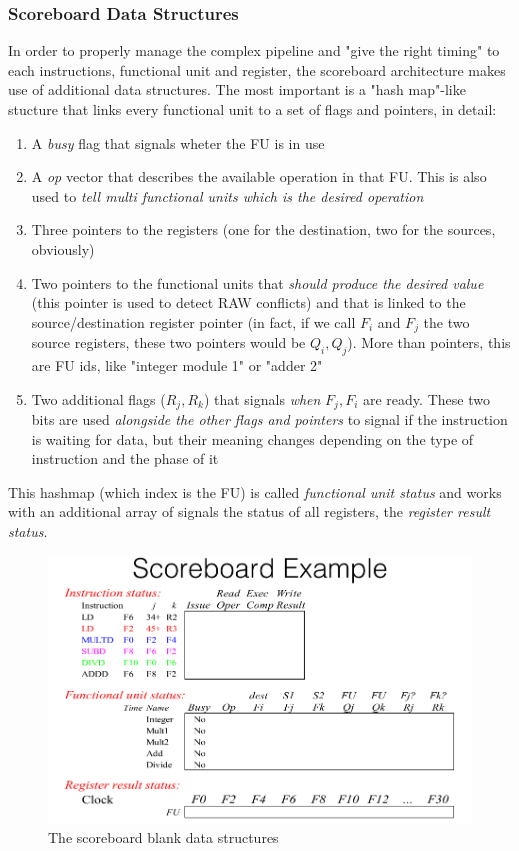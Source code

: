 \documentclass[10pt,a4paper]{article}
\begin{document}
				\subsubsection{Scoreboard Data Structures}
 					In order to properly manage the complex pipeline and "give the right timing" to each instructions, functional unit and register, the scoreboard architecture makes use of additional data structures. The most important is a "hash map"-like stucture that links every functional unit to a set of flags and pointers, in detail:
 					\begin{enumerate}
 						\item A \emph{busy} flag that signals wheter the FU is in use
 						\item A \emph{op} vector that describes the available operation in that FU. This is also used to \emph{tell multi functional units which is the desired operation}
 						\item Three pointers to the registers (one for the destination, two for the sources, obviously)
 						\item Two pointers to the functional units that \emph{should produce the desired value} (this pointer is used to detect RAW conflicts) and that is linked to the source/destination register pointer (in fact, if we call $F_i$ and $F_j$ the two source registers, these two pointers would be $Q_i, Q_j$). More than pointers, this are FU ids, like "integer module 1" or "adder 2"
 						\item Two additional flags ($R_j, R_k$) that signals \emph{when} $F_j,F_i$ are ready. These two bits are used \emph{alongside the other flags and pointers} to signal if the instruction is waiting for data, but their meaning changes depending on the type of instruction and the phase of it
 					\end{enumerate}
 					This hashmap (which index is the FU) is called \emph{functional unit status} and works with an additional array of signals the status of all registers, the \emph{register result status}.
					\begin{figure}[H]
						\centering
						\includegraphics[width = \textwidth]{./images/Scoreboard1.png}
						\caption{The scoreboard blank data structures}
					\end{figure}
\end{document}
